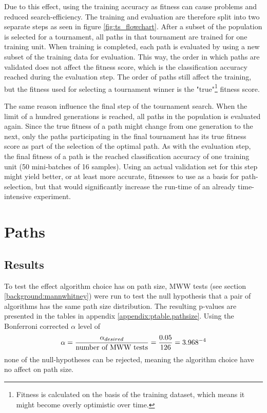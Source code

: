 Due to this effect, using the training accuracy as fitness can cause problems and reduced search-efficiency. The training and evaluation are therefore split into two separate steps as seen in figure \ref{fig:ts_flowchart}. After a subset of the population is selected for a tournament, all paths in that tournament are trained for one training unit. When training is completed, each path is evaluated by using a new subset of the training data for evaluation. This way, the order in which paths are validated does not affect the fitness score, which is the classification accuracy reached during the evaluation step. The order of paths still affect the training, but the fitness used for selecting a tournament winner is the "true"\footnote{Fitness is calculated on the basis of the training dataset, which means it might become overly optimistic over time.} fitness score.

The same reason influence the final step of the tournament search. When the limit of a hundred generations is reached, all paths in the population is evaluated again. Since the true fitness of a path might change from one generation to the next, only the paths participating in the final tournament has its true fitness score as part of the selection of the optimal path. As with the evaluation step, the final fitness of a path is the reached classification accuracy of one training unit (50 mini-batches of 16 samples). Using an actual validation set for this step might yield better, or at least more accurate, fitnesses to use as a basis for path-selection, but that would significantly increase the run-time of an already time-intensive experiment. 

\section{Paths}
\subsection{Results}
To test the effect algorithm choice has on path size, MWW tests (see section \ref{background:mannwhitney}) were run to test the null hypothesis that a pair of algorithms has the same path size distribution. The resulting p-values are presented in the tables in appendix \ref{appendix:ptable.pathsize}. Using the Bonferroni corrected \(\alpha\) level of 
\begin{equation*}
    \alpha=\frac{\alpha_{desired}}{\text{number of MWW tests}}=\frac{0.05}{126}=3.968\time 10^{-4}
\end{equation*}
none of the null-hypotheses can be rejected, meaning the algorithm choice have no affect on path size. 


